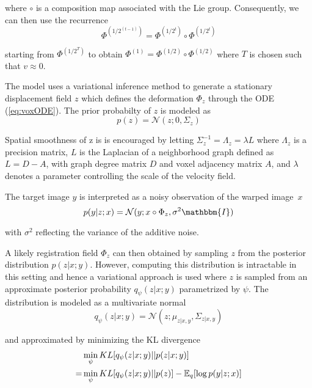 where $\circ$ is a composition map associated with the Lie group. Consequently, we can then use the recurrence
\begin{equation} \label{eq:voxrecurrence}
	\Phi^{(1/2^{(t-1)})} = \Phi^{(1/2^{t})} \circ \Phi^{(1/2^{t})}
\end{equation}

starting from $\Phi^{(1/2^T)}$ to obtain $\Phi^{(1)} = \Phi^{(1/2)} \circ \Phi^{(1/2)}$ where $T$ is chosen such that $v \approx 0$.

The model uses a variational inference method to generate a stationary displacement field $z$ which defines the deformation $\Phi_z$ through the ODE (\ref{eq:voxODE}). The prior probabilty of $z$ is modeled as
\begin{equation}
	p(z) = \mathcal{N}(z; 0, \Sigma_z)
\end{equation}

Spatial smoothness of z is is encouraged by letting ${\Sigma_z^{-1} = \Lambda_z = \lambda L}$ where $\Lambda_z$ is a precision matrix, $L$ is the Laplacian of a neighborhood graph defined as $L = D - A$, with graph degree matrix $D$ and voxel adjacency matrix $A$, and $\lambda$ denotes a parameter controlling the scale of the velocity field.

The target image $y$ is interpreted as a noisy observation of the warped image~$x$
\begin{equation}
	p(y|z;x) = \mathcal{N}(y; x \circ \Phi_z, \sigma^2 \mathbbm{I})
\end{equation}

with $\sigma^2$ reflecting the variance of the additive noise.

A likely registration field $\Phi_z$ can then obtained by sampling $z$ from the posterior distribution $p(z | x; y)$.
However, computing this distribution is intractable in this setting and hence a variational approach is used where $z$ is sampled from an approximate posterior probability $q_\psi(z | x; y)$ parametrized by $\psi$. The distribution is modeled as a multivariate normal
\begin{equation}
	q_\psi(z | x; y) = \mathcal{N}(z; \mu_{z | x, y}, \Sigma_{z | x, y})
\end{equation}

and approximated by minimizing the KL divergence
\begin{equation}
	\begin{split}
		  &\min_\psi KL [ q_\psi(z | x; y) || p(z | x; y) ] \\
		= &\min_\psi KL [ q_\psi(z | x; y) || p(z) ] - \mathbb{E}_q [ \log p(y | z; x) ]
	\end{split}
\end{equation}

